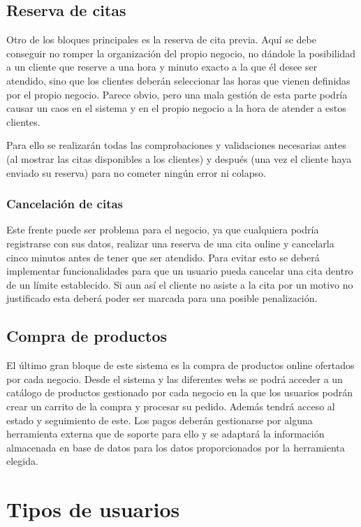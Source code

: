 \subsection{Reserva de citas}

Otro de los bloques principales es la reserva de cita previa. Aquí se debe conseguir no romper la organización del propio negocio, no dándole la posibilidad a un cliente que reserve a una hora y minuto exacto a la que él desee ser atendido, sino que los clientes deberán seleccionar las horas que vienen definidas por el propio negocio. Parece obvio, pero una mala gestión de esta parte podría causar un caos en el sistema y en el propio negocio a la hora de atender a estos clientes.

Para ello se realizarán todas las comprobaciones y validaciones necesarias antes (al mostrar las citas disponibles a los clientes) y después (una vez el cliente haya enviado su reserva) para no cometer ningún error ni colapso.

\subsubsection{Cancelación de citas}

Este frente puede ser problema para el negocio, ya que cualquiera podría registrarse con sus datos, realizar una reserva de una cita online y cancelarla cinco minutos antes de tener que ser atendido. Para evitar esto se deberá implementar funcionalidades para que un usuario pueda cancelar una cita dentro de un límite establecido. Si aun así el cliente no asiste a la cita por un motivo no justificado esta deberá poder ser marcada para una posible penalización.

\subsection{Compra de productos}

El último gran bloque de este sistema es la compra de productos online ofertados por cada negocio. Desde el sistema y las diferentes webs se podrá acceder a un catálogo de productos gestionado por cada negocio en la que los usuarios podrán crear un carrito de la compra y procesar su pedido. Además tendrá acceso al estado y seguimiento de este. Los pagos deberán gestionarse por alguna herramienta externa que de soporte para ello y se adaptará la información almacenada en base de datos para los datos proporcionados por la herramienta elegida.

\section{Tipos de usuarios}

